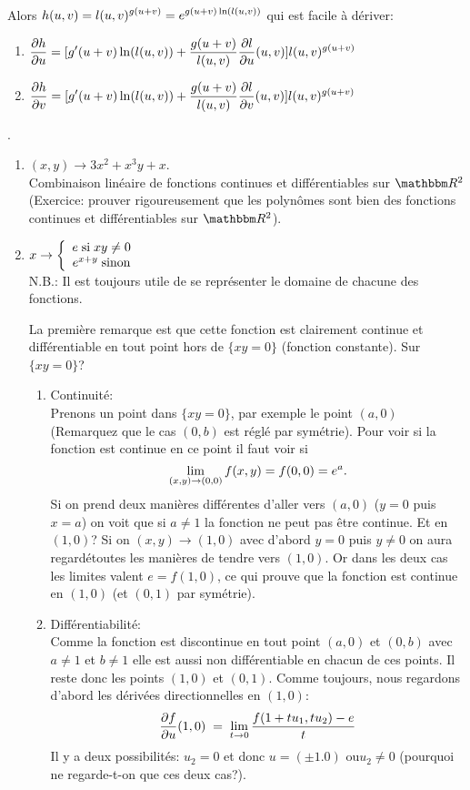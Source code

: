 \noindent Alors $\dst{h(u,v)=l(u,v)^{g(u+v)} = e^{g(u+v)\ln(l(u,v))}}$ qui est facile à dériver:

\begin{enumerate}
\item $\dst{\dhdu = [g'(u+v)\ln(l(u,v))+\f{g(u+v)}{l(u,v)}\dldu(u,v)] l(u,v)^{g(u+v)}}$
\item $\dst{\dhdv = [g'(u+v)\ln(l(u,v))+\f{g(u+v)}{l(u,v)}\dldv(u,v)] l(u,v)^{g(u+v)}}$
\end{enumerate}



.
\begin{enumerate}
\item $(x,y)\rightarrow  3x^2+x^3y+x$.\\
Combinaison linéaire de fonctions continues et différentiables sur $\eR^2$ (Exercice: prouver rigoureusement que les polyn\^{o}mes sont bien des fonctions continues et différentiables sur $\eR^2$).

\item  $\dst{x\rightarrow \left\{\ba{c}e \; {\rm si}\;xy\neq0\\
              			        e^{x+y}\;{\rm sinon} \ea\right.}$\\
N.B.: Il est toujours utile de se représenter le domaine de chacune des fonctions. 

\noindent La première remarque est que cette fonction est clairement continue et différentiable en tout point hors de $\{xy=0\}$ (fonction constante). Sur $\{xy=0\}$?
\begin{enumerate}
\item Continuité:\\
Prenons un point dans $\{xy=0\}$, par exemple le point $(a,0)$ (Remarquez que le cas $(0,b)$ est réglé par symétrie). Pour voir si la fonction est continue en ce point il faut voir si \[\dst{\lim_{(x,y)\rightarrow (0,0)}f(x,y)=f(0,0)=e^a}.\] Si on prend deux manières différentes d'aller vers $(a,0)$ ($y=0$ puis $x=a$) on voit que si $a \neq1$ la fonction ne peut pas \^{e}tre continue. Et en $(1,0)$? Si on $(x,y)\rightarrow (1,0)$ avec d'abord $y=0$ puis $y\neq0$ on aura regardétoutes les manières de tendre vers $(1,0)$. Or dans les deux cas les limites valent $e = f(1,0)$, ce qui prouve que la fonction est continue en $(1,0)$ (et $(0,1)$ par symétrie).

\item Différentiabilité:\\
Comme la fonction est discontinue en tout point $(a,0)$ et $(0,b)$ avec $a\neq1$ et $b\neq1$ elle est aussi non différentiable en chacun de ces points. Il reste donc les points $(1,0)$ et $(0,1)$. Comme toujours, nous regardons d'abord les dérivées directionnelles en $(1,0)$:
\[\dfdu(1,0) \;=\;\lim_{t\rightarrow 0}\f{f(1+tu_1,tu_2)-e}{t}\]
Il y a deux possibilités: $u_2=0$ et donc $u=(\pm1.0)$ ou$u_2\neq0$ (pourquoi ne regarde-t-on que ces deux cas?).


\end{enumerate}
\end{enumerate}
